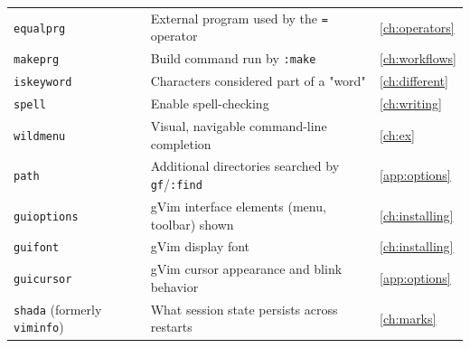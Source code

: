 \begin{longtable}{@{}l p{9cm} l@{}}
\texttt{equalprg} & External program used by the \texttt{=} operator & \ref{ch:operators} \\
\texttt{makeprg} & Build command run by \texttt{:make} & \ref{ch:workflows} \\
\texttt{iskeyword} & Characters considered part of a "word" & \ref{ch:different} \\
\texttt{spell} & Enable spell-checking & \ref{ch:writing} \\
\texttt{wildmenu} & Visual, navigable command-line completion & \ref{ch:ex} \\
\texttt{path} & Additional directories searched by \texttt{gf}/\texttt{:find} & \ref{app:options} \\
\texttt{guioptions} & gVim interface elements (menu, toolbar) shown & \ref{ch:installing} \\
\texttt{guifont} & gVim display font & \ref{ch:installing} \\
\texttt{guicursor} & gVim cursor appearance and blink behavior & \ref{app:options} \\
\texttt{shada} (formerly \texttt{viminfo}) & What session state persists across restarts & \ref{ch:marks} \\
\end{longtable}
